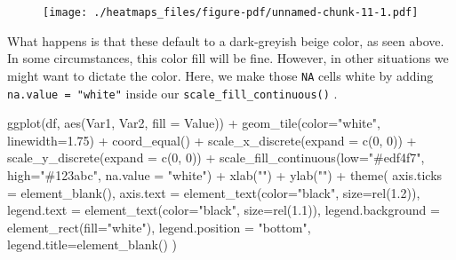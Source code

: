 \documentclass[
  letterpaper,
  DIV=11,
  numbers=noendperiod]{scrreprt}
\newenvironment{Shaded}{\begin{snugshade}}{\end{snugshade}}
\newcommand{\AttributeTok}[1]{\textcolor[rgb]{0.40,0.45,0.13}{#1}}
\newcommand{\DecValTok}[1]{\textcolor[rgb]{0.68,0.00,0.00}{#1}}
\newcommand{\FloatTok}[1]{\textcolor[rgb]{0.68,0.00,0.00}{#1}}
\newcommand{\FunctionTok}[1]{\textcolor[rgb]{0.28,0.35,0.67}{#1}}
\newcommand{\NormalTok}[1]{\textcolor[rgb]{0.00,0.23,0.31}{#1}}
\newcommand{\SpecialCharTok}[1]{\textcolor[rgb]{0.37,0.37,0.37}{#1}}
\newcommand{\StringTok}[1]{\textcolor[rgb]{0.13,0.47,0.30}{#1}}
\begin{document}
\begin{figure}[H]

{\centering \texttt{[image: ./heatmaps\_files/figure-pdf/unnamed-chunk-11-1.pdf]}

}

\end{figure}

What happens is that these default to a dark-greyish beige color, as
seen above. In some circumstances, this color fill will be fine.
However, in other situations we might want to dictate the color. Here,
we make those \texttt{NA} cells white by adding
\texttt{na.value\ =\ "white"} inside our
\texttt{scale\_fill\_continuous()} .

\begin{Shaded}
\begin{Highlighting}[]
\FunctionTok{ggplot}\NormalTok{(df, }\FunctionTok{aes}\NormalTok{(Var1, Var2, }\AttributeTok{fill =}\NormalTok{ Value)) }\SpecialCharTok{+} 
  \FunctionTok{geom\_tile}\NormalTok{(}\AttributeTok{color=}\StringTok{"white"}\NormalTok{, }\AttributeTok{linewidth=}\FloatTok{1.75}\NormalTok{) }\SpecialCharTok{+}
  \FunctionTok{coord\_equal}\NormalTok{() }\SpecialCharTok{+}
  \FunctionTok{scale\_x\_discrete}\NormalTok{(}\AttributeTok{expand =} \FunctionTok{c}\NormalTok{(}\DecValTok{0}\NormalTok{, }\DecValTok{0}\NormalTok{)) }\SpecialCharTok{+}
  \FunctionTok{scale\_y\_discrete}\NormalTok{(}\AttributeTok{expand =} \FunctionTok{c}\NormalTok{(}\DecValTok{0}\NormalTok{, }\DecValTok{0}\NormalTok{)) }\SpecialCharTok{+} 
  \FunctionTok{scale\_fill\_continuous}\NormalTok{(}\AttributeTok{low=}\StringTok{"\#edf4f7"}\NormalTok{, }\AttributeTok{high=}\StringTok{"\#123abc"}\NormalTok{, }\AttributeTok{na.value =} \StringTok{"white"}\NormalTok{) }\SpecialCharTok{+}
  \FunctionTok{xlab}\NormalTok{(}\StringTok{""}\NormalTok{) }\SpecialCharTok{+} 
  \FunctionTok{ylab}\NormalTok{(}\StringTok{""}\NormalTok{) }\SpecialCharTok{+}
  \FunctionTok{theme}\NormalTok{(}
    \AttributeTok{axis.ticks =} \FunctionTok{element\_blank}\NormalTok{(), }
    \AttributeTok{axis.text =} \FunctionTok{element\_text}\NormalTok{(}\AttributeTok{color=}\StringTok{"black"}\NormalTok{, }\AttributeTok{size=}\FunctionTok{rel}\NormalTok{(}\FloatTok{1.2}\NormalTok{)),}
    \AttributeTok{legend.text =} \FunctionTok{element\_text}\NormalTok{(}\AttributeTok{color=}\StringTok{"black"}\NormalTok{, }\AttributeTok{size=}\FunctionTok{rel}\NormalTok{(}\FloatTok{1.1}\NormalTok{)),}
    \AttributeTok{legend.background =} \FunctionTok{element\_rect}\NormalTok{(}\AttributeTok{fill=}\StringTok{"white"}\NormalTok{),}
    \AttributeTok{legend.position =} \StringTok{"bottom"}\NormalTok{,}
    \AttributeTok{legend.title=}\FunctionTok{element\_blank}\NormalTok{()}
\NormalTok{  )}
\end{Highlighting}
\end{Shaded}
\end{document}
